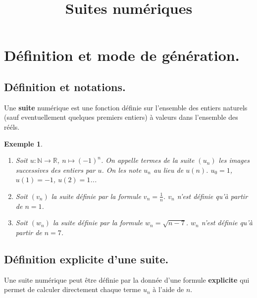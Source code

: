 \documentclass[a4paper,11pt]{article}
\title{Suites numériques}
\author{}
\date{}
\theoremstyle{break}
\newcounter{enonce}
\newtheorem{exemple}[enonce]{Exemple}
\begin{document}
 
  \maketitle


  
  \section{Définition et mode de génération.}
  
  \subsection{Définition et notations.}
 
  
  \begin{definition}
  Une \textbf{suite} numérique est une fonction définie sur l'ensemble 
  des entiers naturels (sauf eventuellement quelques premiers entiers) à valeurs dans l'ensemble
  des rééls. 
  \end{definition}
  
   \begin{exemple} \label{exsuite}
   \begin{enumerate}
    \item Soit $u:\mathbb{N} \to \mathbb{R}$, $n \mapsto (-1)^n$. On appelle termes de la 
    suite $(u_n)$ les images successives des entiers par $u$.
   On les note $u_n$ au lieu de $u(n)$. $u_0=1$, $u(1)=-1$, $u(2)=1$...
   \item Soit $(v_n)$ la suite définie par la formule $v_n=\frac{1}{n}$. $v_n$ n'est 
   définie qu'à partir de $n=1$.
   \item Soit $(w_n)$ la suite définie par la formule $w_n=\sqrt{n-7}$. $w_n$ 
   n'est définie qu'à partir de $n=7$.
   \end{enumerate}

  \end{exemple}

  \subsection{Définition explicite d'une suite.} 
    
  \begin{definition}
  Une suite numérique peut être définie par la donnée d'une formule 
  \textbf{explicite}
  qui permet de calculer directement chaque terme $u_n$ à l'aide de $n$.
  \end{definition}
  
\end{document}
